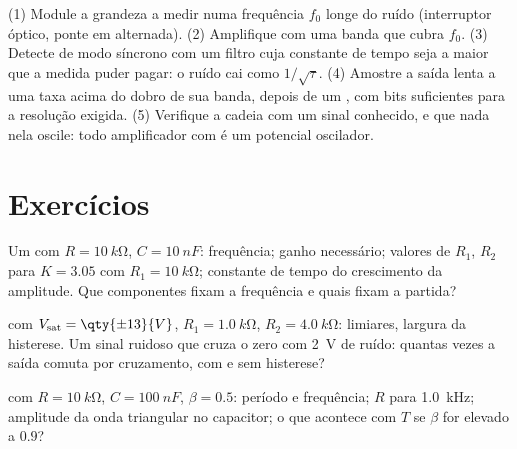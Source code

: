 \begin{method}\label{met:b2:feedback-oscillators:method}
(1) Module a grandeza a medir numa frequência $f_0$ longe do
ruído (interruptor óptico, ponte em alternada). (2) Amplifique com uma banda que cubra
$f_0$. (3) Detecte de modo síncrono com um filtro cuja constante de tempo seja
a maior que a medida puder pagar: o ruído cai como
$1/\sqrt\tau$. (4) Amostre a saída lenta a uma taxa acima do dobro de sua
banda, depois de um , com bits suficientes para a
resolução exigida. (5) Verifique a cadeia com um sinal conhecido, e que
nada nela oscile: todo amplificador com  é um potencial
oscilador.
\end{method}

\section{Exercícios}

\begin{exercise}[$\star$]\label{exo:b2:feedback-oscillators:1}
Um  com $R = \qty{10}{k\ohm}$, $C = \qty{10}{nF}$:
frequência; ganho necessário; valores de $R_1$, $R_2$ para $K = 3.05$ com $R_1 =
\qty{10}{k\ohm}$; constante de tempo do crescimento da amplitude. Que componentes
fixam a frequência e quais fixam a partida?
\end{exercise}

\begin{exercise}[$\star$]\label{exo:b2:feedback-oscillators:2}
 com $V_{\text{sat}} = \qty{\pm 13}{V}$, $R_1 = \qty{1.0}{k\ohm}$,
$R_2 = \qty{4.0}{k\ohm}$: limiares, largura da histerese. Um sinal ruidoso
que cruza o zero com \qty{2}{V} de ruído: quantas vezes a saída
comuta por cruzamento, com e sem histerese?
\end{exercise}

\begin{exercise}[$\star$]\label{exo:b2:feedback-oscillators:3}
 com $R = \qty{10}{k\ohm}$, $C = \qty{100}{nF}$, $\beta = 0.5$:
período e frequência; $R$ para \qty{1.0}{kHz}; amplitude da onda triangular
no capacitor; o que acontece com $T$ se $\beta$ for elevado a $0.9$?
\end{exercise}

